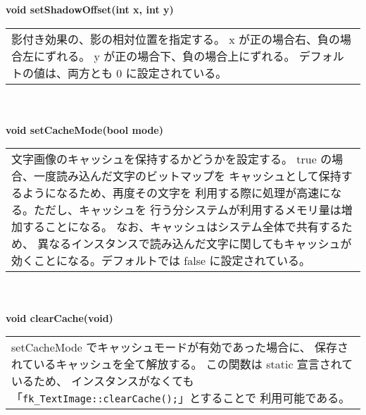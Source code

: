 \begin{tabbing}
\> \textbf{void setShadowOffset(int x, int y)} \\
	\> \> \begin{tabular}{p{15cm}}
		影付き効果の、影の相対位置を指定する。
		x が正の場合右、負の場合左にずれる。
		y が正の場合下、負の場合上にずれる。
		デフォルトの値は、両方とも 0 に設定されている。
	\end{tabular} \\ \\

\> \textbf{void setCacheMode(bool mode)} \\
	\> \> \begin{tabular}{p{15cm}}
		文字画像のキャッシュを保持するかどうかを設定する。
		true の場合、一度読み込んだ文字のビットマップを
		キャッシュとして保持するようになるため、再度その文字を
		利用する際に処理が高速になる。ただし、キャッシュを
		行う分システムが利用するメモリ量は増加することになる。
		なお、キャッシュはシステム全体で共有するため、
		異なるインスタンスで読み込んだ文字に関してもキャッシュが
		効くことになる。デフォルトでは false に設定されている。
	\end{tabular} \\ \\

\> \textbf{void clearCache(void)} \\
	\> \> \begin{tabular}{p{15cm}}
		setCacheMode でキャッシュモードが有効であった場合に、
		保存されているキャッシュを全て解放する。
		この関数は static 宣言されているため、
		インスタンスがなくても
		「\verb+fk_TextImage::clearCache();+」とすることで
		利用可能である。
	\end{tabular} \\ \\

\end{tabbing}


